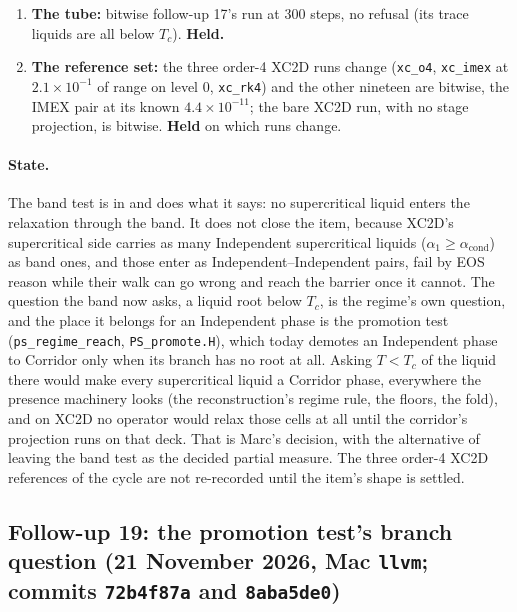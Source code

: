 \documentclass[11pt,a4paper]{article}
\newcommand{\code}[1]{\texttt{\small #1}}
\begin{document}
\begin{enumerate}[nosep]
      Independent--Independent pair, is the path the band test does not
      touch, and it carries the same count of cells (128) as the failures
      and clamps reach (62 per step, two stages).  \textbf{The falsifier
      fired} as written: a path other than the band.
\item \textbf{The tube:} bitwise follow-up 17's run at 300 steps, no refusal (its trace liquids are all below $T_c$).  \textbf{Held.}
\item \textbf{The reference set:} the three order-4 XC2D runs change
      (\code{xc\_o4}, \code{xc\_imex} at $2.1\times10^{-1}$ of range on
      level 0, \code{xc\_rk4}) and the other nineteen are bitwise, the
      IMEX pair at its known $4.4\times10^{-11}$; the bare XC2D run, with
      no stage projection, is bitwise.  \textbf{Held} on which runs
      change.
\end{enumerate}

\paragraph{State.}  The band test is in and does what it says: no
supercritical liquid enters the relaxation through the band.  It does
not close the item, because XC2D's supercritical side carries as many
Independent supercritical liquids ($\alpha_1 \ge \alpha_{\mathrm{cond}}$)
as band ones, and those enter as Independent--Independent pairs, fail by
EOS reason while their walk can go wrong and reach the barrier once it
cannot.  The question the band now asks, a liquid root below $T_c$, is
the regime's own question, and the place it belongs for an Independent
phase is the promotion test (\code{ps\_regime\_reach},
\code{PS\_promote.H}), which today demotes an Independent phase to
Corridor only when its branch has no root at all.  Asking $T < T_c$ of
the liquid there would make every supercritical liquid a Corridor phase,
everywhere the presence machinery looks (the reconstruction's regime
rule, the floors, the fold), and on XC2D no operator would relax those
cells at all until the corridor's projection runs on that deck.  That is
Marc's decision, with the alternative of leaving the band test as the
decided partial measure.  The three order-4 XC2D references of the
cycle are not re-recorded until the item's shape is settled.


\subsection{Follow-up 19: the promotion test's branch question (21 November 2026, Mac \code{llvm}; commits \code{72b4f87a} and \code{8aba5de0})}
\end{document}
